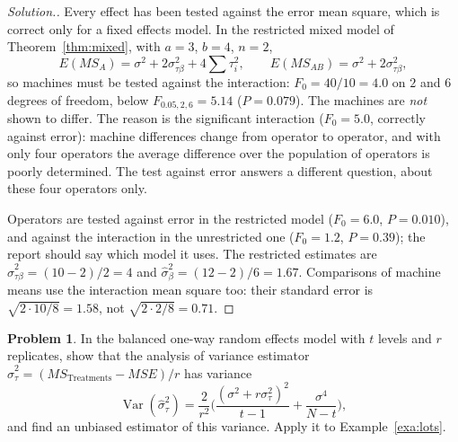 \documentclass[11pt,a4paper]{article}
\numberwithin{equation}{section}
\DeclareMathOperator{\Var}{Var}
\theoremstyle{definition}
\newtheorem{problemx}{Problem}[subsection]
\newenvironment{problem}{\begin{problemx}}{\end{problemx}}
\newenvironment{solution}
  {\renewcommand{\qedsymbol}{}\begin{proof}[\textit{Solution}.]}
  {\end{proof}}
\begin{document}
\begin{solution}
Every effect has been tested against the error mean square, which is correct only for a fixed effects model. In the restricted mixed model of
Theorem~\ref{thm:mixed}, with $a = 3$, $b = 4$, $n = 2$,
\[
E(MS_A) = \sigma^2 + 2\sigma^2_{\tau\beta} + 4\sum\tau_i^2 , \qquad E(MS_{AB}) = \sigma^2 + 2\sigma^2_{\tau\beta} ,
\]
so machines must be tested against the interaction: $F_0 = 40/10 = 4.0$ on $2$ and $6$ degrees of freedom, below $F_{0.05, 2, 6} = 5.14$ ($P = 0.079$). The machines
are \emph{not} shown to differ. The reason is the significant interaction ($F_0 = 5.0$, correctly against error): machine differences change from operator to
operator, and with only four operators the average difference over the population of operators is poorly determined. The test against error
answers a different question, about these four operators only.

Operators are tested against error in the restricted model ($F_0 = 6.0$, $P = 0.010$), and against the interaction in the unrestricted one ($F_0 = 1.2$,
$P = 0.39$); the report should say which model it uses. The restricted estimates are $\hat\sigma^2_{\tau\beta} = (10 - 2)/2 = 4$ and $\hat\sigma^2_\beta = (12 - 2)/6 = 1.67$. Comparisons of
machine means use the interaction mean square too: their standard error is $\sqrt{2 \cdot 10/8} = 1.58$, not $\sqrt{2 \cdot 2/8} = 0.71$.
\end{solution}

\begin{problem}
In the balanced one-way random effects model with $t$ levels and $r$ replicates, show that the analysis of variance estimator
$\hat\sigma^2_\tau = (MS_{\mathrm{Treatments}} - MSE)/r$ has variance
\[
\Var(\hat\sigma^2_\tau) = \frac2{r^2}\biggl(\frac{(\sigma^2 + r\sigma^2_\tau)^2}{t - 1} + \frac{\sigma^4}{N - t}\biggr) ,
\]
and find an unbiased estimator of this variance. Apply it to Example~\ref{exa:lots}.
\end{problem}
\end{document}
